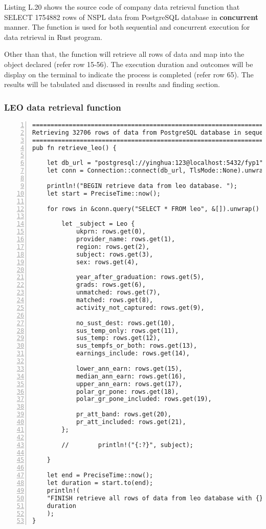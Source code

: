 Listing L.20 shows the source code of company data retrieval function that SELECT 1754882 rows of NSPL data from PostgreSQL database in \textbf{concurrent} manner. The function is used for both sequential and concurrent execution for data retrieval in Rust program. 

Other than that, the function will retrieve all rows of data and map into the object declared (refer row 15-56). The execution duration and outcomes will be display on the terminal to indicate the process is completed (refer row 65). The results will be tabulated and discussed in results and finding section. 

\newpage

\subsubsection{LEO data retrieval function}

\lstset{basicstyle=\ttfamily\tiny}  
\begin{lstlisting}[breaklines, frame=single, numbers=left, caption={Function for LEO data retrieval. (leo.rs)}, label=commandline-02]
=============================================================================
Retrieving 32706 rows of data from PostgreSQL database in sequential manner
=============================================================================
pub fn retrieve_leo() {

	let db_url = "postgresql://yinghua:123@localhost:5432/fyp1";
	let conn = Connection::connect(db_url, TlsMode::None).unwrap();
	
	println!("BEGIN retrieve data from leo database. ");
	let start = PreciseTime::now();
	
	for rows in &conn.query("SELECT * FROM leo", &[]).unwrap() {
	
		let _subject = Leo {
			ukprn: rows.get(0),
			provider_name: rows.get(1),
			region: rows.get(2),
			subject: rows.get(3),
			sex: rows.get(4),
			
			year_after_graduation: rows.get(5),
			grads: rows.get(6),
			unmatched: rows.get(7),
			matched: rows.get(8),
			activity_not_captured: rows.get(9),
			
			no_sust_dest: rows.get(10),
			sus_temp_only: rows.get(11),
			sus_temp: rows.get(12),
			sus_tempfs_or_both: rows.get(13),
			earnings_include: rows.get(14),
			
			lower_ann_earn: rows.get(15),
			median_ann_earn: rows.get(16),
			upper_ann_earn: rows.get(17),
			polar_gr_pone: rows.get(18),
			polar_gr_pone_included: rows.get(19),
			
			pr_att_band: rows.get(20),
			pr_att_included: rows.get(21),
		};
		
		//        println!("{:?}", subject);
		
	}
	
	let end = PreciseTime::now();
	let duration = start.to(end);
	println!(
	"FINISH retrieve all rows of data from leo database with {} seconds.",
	duration
	);
}

\end{lstlisting}

